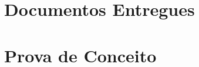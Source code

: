 \chapter{Documentos Entregues}
\label{documentos_entregues}


\chapter{Prova de Conceito}
\label{POC}

